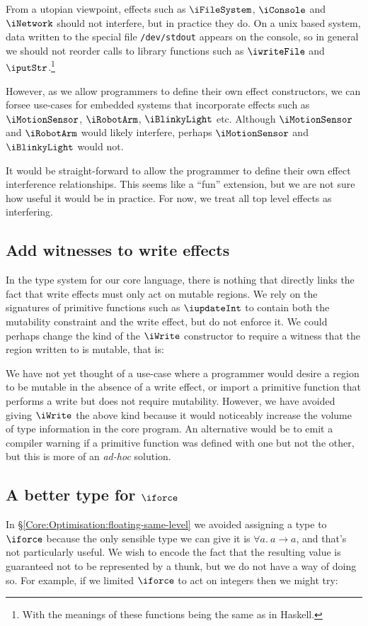 From a utopian viewpoint, effects such as $\iFileSystem$, $\iConsole$ and $\iNetwork$ should not interfere, but in practice they do. On a unix based system, data written to the special file \texttt{/dev/stdout} appears on the console, so in general we should not reorder calls to library functions such as $\iwriteFile$ and $\iputStr$.\footnote{With the meanings of these functions being the same as in Haskell.}

However, as we allow programmers to define their own effect constructors, we can forsee use-cases for embedded systems that incorporate effects such as $\iMotionSensor$, $\iRobotArm$, $\iBlinkyLight$ etc. Although $\iMotionSensor$ and $\iRobotArm$ would likely interfere, perhaps $\iMotionSensor$ and $\iBlinkyLight$ would not.

It would be straight-forward to allow the programmer to define their own effect interference relationships. This seems like a ``fun'' extension, but we are not sure how useful it would be in practice. For now, we treat all top level effects as interfering.


\subsection{Add witnesses to write effects}

In the type system for our core language, there is nothing that directly links the fact that write effects must only act on mutable regions. We rely on the signatures of primitive functions such as $\iupdateInt$ to contain both the mutability constraint and the write effect, but do not enforce it. We could perhaps change the kind of the $\iWrite$ constructor to require a witness that the region written to is mutable, that is:


We have not yet thought of a use-case where a programmer would desire a region to be mutable in the absence of a write effect, or import a primitive function that performs a write but does not require mutability. However, we have avoided giving $\iWrite$ the above kind because it would noticeably increase the volume of type information in the core program. An alternative would be to emit a compiler warning if a primitive function was defined with one but not the other, but this is more of an \emph{ad-hoc} solution. 


\subsection{A better type for $\iforce$}
\label{Evaluation:Limits:force}
In \S\ref{Core:Optimisation:floating-same-level} we avoided assigning a type to $\iforce$ because the only sensible type we can give it is $\forall a. \ a \to a$, and that's not particularly useful. We wish to encode the fact that the resulting value is guaranteed not to be represented by a thunk, but we do not have a way of doing so. For example, if we limited $\iforce$ to act on integers then we might try:

